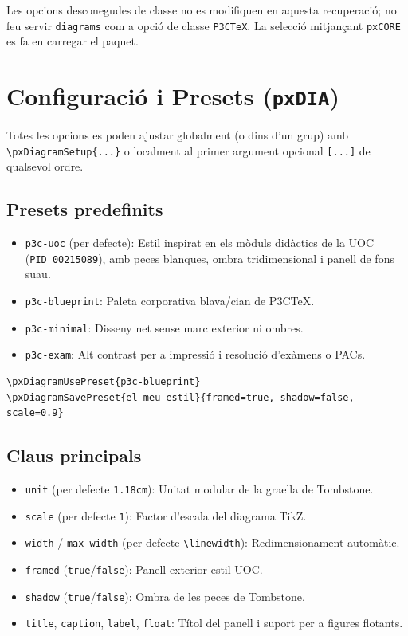\documentclass[11pt,a4paper]{article}
\begin{document}
Les opcions desconegudes de classe no es modifiquen en aquesta recuperaci\'o;
no feu servir \texttt{diagrams} com a opci\'o de classe \texttt{P3CTeX}.
La selecci\'o mitjan\c{c}ant \texttt{pxCORE} es fa en carregar el paquet.

\section{Configuraci\'o i Presets (\texttt{pxDIA})}

 Totes les opcions es poden ajustar globalment (o dins d'un grup) amb \verb|\pxDiagramSetup{...}|
o localment al primer argument opcional \verb|[...]| de qualsevol ordre.

\subsection{Presets predefinits}
\begin{itemize}
  \item \texttt{p3c-uoc} (per defecte): Estil inspirat en els m\`oduls did\`actics de la UOC
    (\texttt{PID\_00215089}), amb peces blanques, ombra tridimensional i panell de fons suau.
  \item \texttt{p3c-blueprint}: Paleta corporativa blava/cian de P3CTeX.
  \item \texttt{p3c-minimal}: Disseny net sense marc exterior ni ombres.
  \item \texttt{p3c-exam}: Alt contrast per a impressi\'o i resoluci\'o d'ex\`amens o PACs.
\end{itemize}

\begin{verbatim}
\pxDiagramUsePreset{p3c-blueprint}
\pxDiagramSavePreset{el-meu-estil}{framed=true, shadow=false, scale=0.9}
\end{verbatim}

\subsection{Claus principals}
\begin{itemize}
  \item \texttt{unit} (per defecte \texttt{1.18cm}): Unitat modular de la graella de Tombstone.
  \item \texttt{scale} (per defecte \texttt{1}): Factor d'escala del diagrama TikZ.
  \item \texttt{width} / \texttt{max-width} (per defecte \texttt{\textbackslash linewidth}): Redimensionament autom\`atic.
  \item \texttt{framed} (\texttt{true}/\texttt{false}): Panell exterior estil UOC.
  \item \texttt{shadow} (\texttt{true}/\texttt{false}): Ombra de les peces de Tombstone.
  \item \texttt{title}, \texttt{caption}, \texttt{label}, \texttt{float}: T\'itol del panell i suport per a figures flotants.
\end{itemize}
\end{document}
